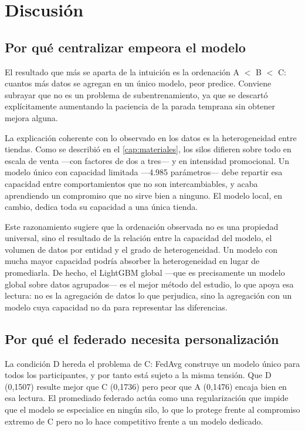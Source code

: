 \chapter{Discusión}
\label{cap:discusion}

\section{Por qué centralizar empeora el modelo}

El resultado que más se aparta de la intuición es la ordenación A $<$ B $<$ C: cuantos más datos se
agregan en un único modelo, peor predice. Conviene subrayar que no es un problema de
subentrenamiento, ya que se descartó explícitamente aumentando la paciencia de la parada temprana
sin obtener mejora alguna.

La explicación coherente con lo observado en los datos es la heterogeneidad entre tiendas. Como se
describió en el \cref{cap:materiales}, los silos difieren sobre todo en escala de venta —con
factores de dos a tres— y en intensidad promocional. Un modelo único con capacidad limitada
—4.985 parámetros— debe repartir esa capacidad entre comportamientos que no son intercambiables, y
acaba aprendiendo un compromiso que no sirve bien a ninguno. El modelo local, en cambio, dedica
toda su capacidad a una única tienda.

Este razonamiento sugiere que la ordenación observada no es una propiedad universal, sino el
resultado de la relación entre la capacidad del modelo, el volumen de datos por entidad y el grado
de heterogeneidad. Un modelo con mucha mayor capacidad podría absorber la heterogeneidad en lugar de
promediarla. De hecho, el LightGBM global —que es precisamente un modelo global sobre datos
agrupados— es el mejor método del estudio, lo que apoya esa lectura: no es la agregación de datos lo
que perjudica, sino la agregación con un modelo cuya capacidad no da para representar las
diferencias.

\section{Por qué el federado necesita personalización}

La condición D hereda el problema de C: FedAvg construye un modelo único para todos los
participantes, y por tanto está sujeto a la misma tensión. Que D (0,1507) resulte mejor que C
(0,1736) pero peor que A (0,1476) encaja bien en esa lectura. El promediado federado actúa como una
regularización que impide que el modelo se especialice en ningún silo, lo que lo protege frente al
compromiso extremo de C pero no lo hace competitivo frente a un modelo dedicado.

